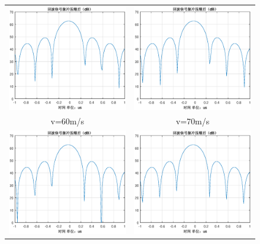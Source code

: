 \documentclass[12pt]{article}
\begin{document}
\begin{figure}[htbp]
  \centering
  \begin{tabular}{cc}
    \includegraphics[width=.5\textwidth]{Doppler_sensitivity_0060}&\includegraphics[width=.5\textwidth]{Doppler_sensitivity_0070}\\
    v=60m/s&v=70m/s\\
    \includegraphics[width=.5\textwidth]{Doppler_sensitivity_0080}&\includegraphics[width=.5\textwidth]{Doppler_sensitivity_0090}\\

\end{tabular}
\end{figure}
\end{document}
